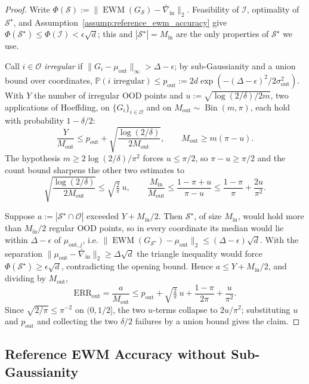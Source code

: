 \documentclass[10pt]{article} %
\theoremstyle{plain}
\theoremstyle{definition}
\begin{document}
\begin{proof}
Write $\Phi(\mathcal S):=\|\operatorname{EWM}(G_{\mathcal S})-\bar\nabla_{\mathrm{in}}\|_2$. Feasibility
of $\mathcal I$, optimality of $\mathcal S^\star$, and Assumption~\ref{assump:reference_ewm_accuracy}
give $\Phi(\mathcal S^\star)\le\Phi(\mathcal I)<\epsilon\sqrt d$; this and $|\mathcal S^\star|=M_{\mathrm{in}}$
are the only properties of $\mathcal S^\star$ we use.

Call $i\in\mathcal O$ \emph{irregular} if $\|G_i-\mu_{\mathrm{out}}\|_\infty>\Delta-\epsilon$; by
sub-Gaussianity and a union bound over coordinates,
$\mathbb P(i\text{ irregular})\le p_{\mathrm{out}}:=2d\exp(-(\Delta-\epsilon)^2/2\sigma_{\mathrm{out}}^2)$.
With $Y$ the number of irregular OOD points and $u:=\sqrt{\log(2/\delta)/2m}$, two applications of
Hoeffding, on $\{G_i\}_{i\in\mathcal O}$ and on $M_{\mathrm{out}}\sim\operatorname{Bin}(m,\pi)$, each hold
with probability $1-\delta/2$:
\[
\frac{Y}{M_{\mathrm{out}}}\le p_{\mathrm{out}}+\sqrt{\frac{\log(2/\delta)}{2M_{\mathrm{out}}}},
\qquad
M_{\mathrm{out}}\ge m(\pi-u).
\]
The hypothesis $m\ge2\log(2/\delta)/\pi^2$ forces $u\le\pi/2$, so $\pi-u\ge\pi/2$ and the count bound
sharpens the other two estimates to
\[
\sqrt{\frac{\log(2/\delta)}{2M_{\mathrm{out}}}}\le\sqrt{\tfrac2\pi}\,u,
\qquad
\frac{M_{\mathrm{in}}}{M_{\mathrm{out}}}\le\frac{1-\pi+u}{\pi-u}\le\frac{1-\pi}{\pi}+\frac{2u}{\pi^2}.
\]

Suppose $a:=|\mathcal S^\star\cap\mathcal O|$ exceeded $Y+M_{\mathrm{in}}/2$. Then $\mathcal S^\star$, of size
$M_{\mathrm{in}}$, would hold more than $M_{\mathrm{in}}/2$ regular OOD points, so in every coordinate its
median would lie within $\Delta-\epsilon$ of $\mu_{\mathrm{out},j}$, i.e.
$\|\operatorname{EWM}(G_{\mathcal S^\star})-\mu_{\mathrm{out}}\|_2\le(\Delta-\epsilon)\sqrt d$. With the
separation $\|\mu_{\mathrm{out}}-\bar\nabla_{\mathrm{in}}\|_2\ge\Delta\sqrt d$ the triangle inequality would
force $\Phi(\mathcal S^\star)\ge\epsilon\sqrt d$, contradicting the opening bound. Hence
$a\le Y+M_{\mathrm{in}}/2$, and dividing by $M_{\mathrm{out}}$,
\[
\mathrm{ERR}_{\mathrm{out}}=\frac{a}{M_{\mathrm{out}}}
\le p_{\mathrm{out}}+\sqrt{\tfrac2\pi}\,u+\frac{1-\pi}{2\pi}+\frac{u}{\pi^2}.
\]
Since $\sqrt{2/\pi}\le\pi^{-2}$ on $(0,1/2]$, the two $u$-terms collapse to $2u/\pi^2$; substituting $u$
and $p_{\mathrm{out}}$ and collecting the two $\delta/2$ failures by a union bound gives the claim.
\end{proof}

\subsection{Reference EWM Accuracy without Sub-Gaussianity}
\label{app:non-subgaussian}
\end{document}
